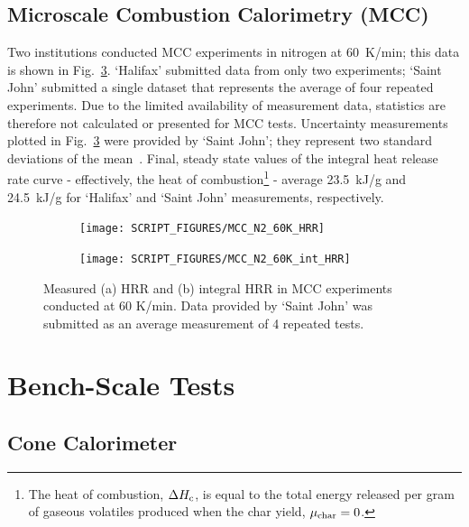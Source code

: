 \documentclass{book}
\begin{document}
\newpage
\subsection{Microscale Combustion Calorimetry (MCC)}

Two institutions conducted MCC experiments in nitrogen at 60~K/min; this data is shown in Fig.~\ref{Fig:MCC_N2_60K}. ‘Halifax’ submitted data from only two experiments; ‘Saint John’ submitted a single dataset that represents the average of four repeated experiments.  Due to the limited availability of measurement data, statistics are therefore not calculated or presented for MCC tests. Uncertainty measurements plotted in Fig.~\ref{Fig:MCC_N2_60K} were provided by ‘Saint John’; they represent two standard deviations of the mean~\cite{fiola2020comparison}. Final, steady state values of the integral heat release rate curve - effectively, the heat of combustion\footnote{The heat of combustion, $\Delta H_{\rm c}$, is equal to the total energy released per gram of gaseous volatiles produced when the char yield, $\mu_{\rm char}=0$.} - average 23.5~kJ/g and 24.5~kJ/g for ‘Halifax’ and ‘Saint John’ measurements, respectively.

\begin{figure}[h]
\centering
\begin{subfigure}[b]{0.75\textwidth}
   \texttt{[image: SCRIPT\_FIGURES/MCC\_N2\_60K\_HRR]}
   \caption{}
   \label{Fig:MCC_N2_60K_HRR}
\end{subfigure}

\begin{subfigure}[b]{0.75\textwidth}
   \texttt{[image: SCRIPT\_FIGURES/MCC\_N2\_60K\_int\_HRR]}
   \caption{}
   \label{Fig:MCC_N2_60K_int_HRR}
\end{subfigure}

  \caption{Measured (a) HRR and (b) integral HRR in MCC experiments conducted at 60 K/min. Data provided by `Saint John' was submitted as an average measurement of 4 repeated tests.}
  \label{Fig:MCC_N2_60K}
\end{figure}


\section{Bench-Scale Tests}

\subsection{Cone Calorimeter}
\end{document}
